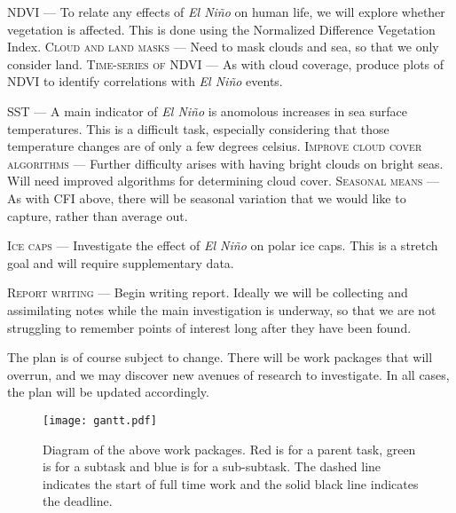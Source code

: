 \documentclass[12pt,preprint]{article}
\newcommand{\elnino}[0]{\emph{El Ni\~no}}
\newcommand{\workpackage}[2]{\textsc{#1} --- #2}
\begin{document}
\workpackage{NDVI}{To relate any effects of \elnino{} on human life,
  we will explore whether vegetation is affected. This is done using
  the Normalized Difference Vegetation Index.} \workpackage{Cloud and
  land masks}{Need to mask clouds and sea, so that we only consider
  land.} \workpackage{Time-series of NDVI}{As with cloud coverage,
  produce plots of NDVI to identify correlations with \elnino{}
  events.}

\vspace{.1cm}

\workpackage{SST}{A main indicator of \elnino{} is anomolous increases
  in sea surface temperatures. This is a difficult task, especially
  considering that those temperature changes are of only a few degrees
  celsius.} \workpackage{Improve cloud cover algorithms}{Further
  difficulty arises with having bright clouds on bright seas. Will
  need improved algorithms for determining cloud cover.}
\workpackage{Seasonal means}{As with CFI above, there will be seasonal
  variation that we would like to capture, rather than average out.}

\vspace{.1cm}

\workpackage{Ice caps}{Investigate the effect of \elnino{} on polar
  ice caps. This is a stretch goal and will require supplementary data.}

\vspace{.1cm}

\workpackage{Report writing}{Begin writing report. Ideally we will be
  collecting and assimilating notes while the main investigation is
  underway, so that we are not struggling to remember points of
  interest long after they have been found.}

\vspace{.1cm}

The plan is of course subject to change. There will be work packages
that will overrun, and we may discover new avenues of research to
investigate. In all cases, the plan will be updated accordingly.

\begin{figure}
  \centering
  \texttt{[image: gantt.pdf]}
  \caption{Diagram of the above work packages. Red is for a parent task, green is for a subtask and blue is for a sub-subtask. The dashed line indicates the start of full time work and the solid black line indicates the deadline.}
\end{figure}
\end{document}
